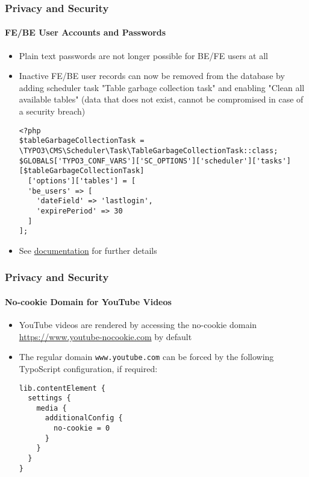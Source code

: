 \begin{frame}[fragile]
	\frametitle{Privacy and Security}
	\framesubtitle{FE/BE User Accounts and Passwords}

	\lstset{basicstyle=\tiny\ttfamily}

	\begin{itemize}
		\item Plain text passwords are not longer possible for BE/FE users at all
		\item Inactive FE/BE user records can now be removed from the database by
			adding scheduler task "Table garbage collection task" and enabling
			"Clean all available tables"\newline
			\smaller
				(data that does not exist, cannot be compromised in case of a
				security breach)
			\normalsize

\begin{lstlisting}
<?php
$tableGarbageCollectionTask = \TYPO3\CMS\Scheduler\Task\TableGarbageCollectionTask::class;
$GLOBALS['TYPO3_CONF_VARS']['SC_OPTIONS']['scheduler']['tasks'][$tableGarbageCollectionTask]
  ['options']['tables'] = [
  'be_users' => [
    'dateField' => 'lastlogin',
    'expirePeriod' => 30
  ]
];
\end{lstlisting}

		\item See \href{https://docs.typo3.org/typo3cms/extensions/scheduler/Installation/BaseTasks/Index.html}{documentation}
			for further details
	\end{itemize}

\end{frame}


\begin{frame}[fragile]
	\frametitle{Privacy and Security}
	\framesubtitle{No-cookie Domain for YouTube Videos}

	\lstset{basicstyle=\tiny\ttfamily}

	\begin{itemize}
		\item YouTube videos are rendered by accessing the no-cookie domain
			\url{https://www.youtube-nocookie.com} by default
		\item The regular domain \texttt{www.youtube.com} can be forced by
			the following TypoScript configuration, if required:

\begin{lstlisting}
lib.contentElement {
  settings {
    media {
      additionalConfig {
        no-cookie = 0
      }
    }
  }
}
\end{lstlisting}

	\end{itemize}

\end{frame}

